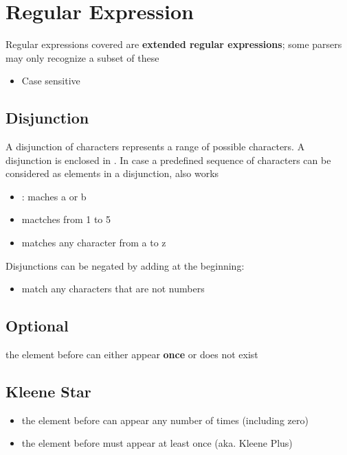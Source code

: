 \section{Regular Expression}

Regular expressions covered are \textbf{extended regular expressions}; some
parsers may only recognize a subset of these

\begin{itemize}
  \item Case sensitive
\end{itemize}

\subsection{Disjunction}

  A disjunction of characters represents a range of possible characters.
  A disjunction is enclosed in . In case a predefined
  sequence of characters can be considered as elements in a disjunction,
   also works

  \begin{itemize}
    \item \code{[ab]}: maches a or b
    \item \code{[12345]} mactches from 1 to 5
    \item \code{[a-z]} matches any character from a to z
  \end{itemize}

  Disjunctions can be negated by adding \code{$ \wedge $} at the beginning:
  \code{[$ \wedge $...]}

  \begin{itemize}
    \item \code{[$ \wedge $0-9]} match any characters that are not numbers
  \end{itemize}

\subsection{Optional}

   the element before  can either appear \textbf{once} or
  does not exist

\subsection{Kleene Star}

  \begin{itemize}
    \item {} the element before \code{*} can appear any number of times
    (including zero)
    \item {} the element before \code{+} must appear at least once
    (aka. Kleene Plus)
  \end{itemize}

